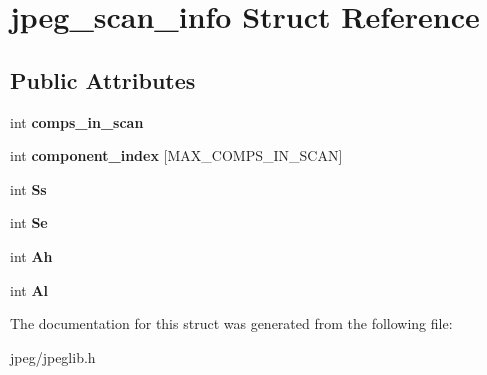 \hypertarget{structjpeg__scan__info}{}\section{jpeg\+\_\+scan\+\_\+info Struct Reference}
\label{structjpeg__scan__info}
\subsection*{Public Attributes}
\begin{DoxyCompactItemize}
\item 
int {\bfseries comps\+\_\+in\+\_\+scan}\hypertarget{structjpeg__scan__info_addd94bff3ee52f961cf6fda5ea86ddca}{}\label{structjpeg__scan__info_addd94bff3ee52f961cf6fda5ea86ddca}

\item 
int {\bfseries component\+\_\+index} \mbox{[}M\+A\+X\+\_\+\+C\+O\+M\+P\+S\+\_\+\+I\+N\+\_\+\+S\+C\+AN\mbox{]}\hypertarget{structjpeg__scan__info_a041f1af60508517345c1b76c48ee6567}{}\label{structjpeg__scan__info_a041f1af60508517345c1b76c48ee6567}

\item 
int {\bfseries Ss}\hypertarget{structjpeg__scan__info_a33bc5abcded36ccd1b4c2ec94f6e2ba5}{}\label{structjpeg__scan__info_a33bc5abcded36ccd1b4c2ec94f6e2ba5}

\item 
int {\bfseries Se}\hypertarget{structjpeg__scan__info_a4eefb8be0412f78566862c28a20fb254}{}\label{structjpeg__scan__info_a4eefb8be0412f78566862c28a20fb254}

\item 
int {\bfseries Ah}\hypertarget{structjpeg__scan__info_a43834ca9482c7ea12cc97cf602da004b}{}\label{structjpeg__scan__info_a43834ca9482c7ea12cc97cf602da004b}

\item 
int {\bfseries Al}\hypertarget{structjpeg__scan__info_a89cc9e990977c50b2b2058e6b9526e67}{}\label{structjpeg__scan__info_a89cc9e990977c50b2b2058e6b9526e67}

\end{DoxyCompactItemize}


The documentation for this struct was generated from the following file\+:\begin{DoxyCompactItemize}
\item 
jpeg/jpeglib.\+h\end{DoxyCompactItemize}
